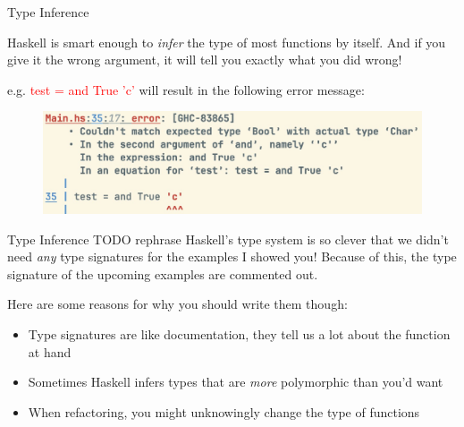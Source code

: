 \documentclass[pdf]{beamer}
\newcommand{\code}[1]{\textcolor{Red}{\textsf{#1}}}
\begin{document}
\begin{frame}[fragile]{Type Inference}
  \begin{figure}[H]
    \centering
    \hspace{0.1cm}
  \end{figure}
  Haskell is smart enough to \textit{infer} the type of most functions by itself. And if you give it the wrong argument, it will tell you exactly what you did wrong!

  e.g. \code{test = and True 'c'} will result in the following error message:
  \begin{figure}[H]
    \centering
    \includegraphics[width=\linewidth]{and-type-error}
  \end{figure}
\end{frame}

\begin{frame}{Type Inference}
  TODO rephrase Haskell's type system is so clever that we didn't need \emph{any} type signatures for the examples I showed you!
  Because of this, the type signature of the upcoming examples are commented out.

  Here are some reasons for why you should write them though:
  \begin{itemize}
  \item Type signatures are like documentation, they tell us a lot about the function at hand
  \item Sometimes Haskell infers types that are \emph{more} polymorphic than you'd want
  \item When refactoring, you might unknowingly change the type of functions
  \end{itemize}
\end{frame}
\end{document}
